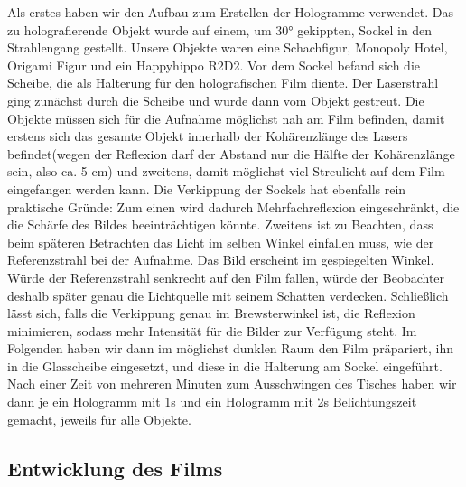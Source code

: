 \documentclass[12pt,a4paper]{article}
\begin{document}
Als erstes haben wir den Aufbau zum Erstellen der Hologramme verwendet. Das zu holografierende Objekt wurde auf einem, um 30° gekippten, Sockel in den Strahlengang gestellt. Unsere Objekte waren eine Schachfigur, Monopoly Hotel, Origami Figur und ein Happyhippo R2D2. Vor dem Sockel befand sich die Scheibe, die als Halterung für den holografischen Film diente. 
Der Laserstrahl ging zunächst durch die Scheibe und wurde dann vom Objekt gestreut. Die Objekte müssen sich für die Aufnahme möglichst nah am Film befinden, damit erstens sich das gesamte Objekt innerhalb der Kohärenzlänge des Lasers befindet(wegen der Reflexion darf der Abstand nur die Hälfte der Kohärenzlänge sein, also ca. 5 cm) und zweitens, damit möglichst viel Streulicht auf dem Film eingefangen werden kann. Die Verkippung der Sockels hat ebenfalls rein praktische Gründe: Zum einen wird dadurch Mehrfachreflexion eingeschränkt, die die Schärfe des Bildes beeinträchtigen könnte. Zweitens ist zu Beachten, dass beim späteren Betrachten das Licht im selben Winkel einfallen muss, wie der Referenzstrahl bei der Aufnahme. Das Bild erscheint im gespiegelten Winkel. Würde der Referenzstrahl senkrecht auf den Film fallen, würde der Beobachter deshalb später genau die Lichtquelle mit seinem Schatten verdecken. Schließlich lässt sich, falls die Verkippung genau im Brewsterwinkel ist, die Reflexion minimieren, sodass mehr Intensität für die Bilder zur Verfügung steht. Im Folgenden haben wir dann im möglichst dunklen Raum den Film präpariert, ihn in die Glasscheibe eingesetzt, und diese in die Halterung am Sockel eingeführt. Nach einer Zeit von mehreren Minuten zum Ausschwingen des Tisches haben wir dann je ein Hologramm mit 1s und ein Hologramm mit 2s Belichtungszeit gemacht, jeweils für alle Objekte.

\subsection{Entwicklung des Films}
\end{document}
